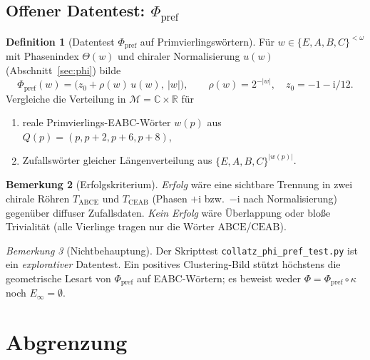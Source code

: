\documentclass[11pt,a4paper]{article}
\theoremstyle{definition}
\newtheorem{definition}{Definition}[section]
\newtheorem{bemerkung}[definition]{Bemerkung}
\theoremstyle{remark}
\newtheorem{remark}[definition]{Bemerkung}
\newcommand{\R}{\mathbb{R}}
\newcommand{\C}{\mathbb{C}}
\newcommand{\Einf}{E_{\infty}}
\newcommand{\SigmaEABC}{\{E,A,B,C\}}
\newcommand{\Phpref}{\Phi_{\mathrm{pref}}}
\begin{document}
\subsection{Offener Datentest: \texorpdfstring{$\Phpref$}{Phi\_pref}}

\begin{definition}[Datentest $\Phpref$ auf Primvierlingswörtern]
Für $w\in\SigmaEABC^{<\omega}$ mit Phasenindex $\Theta(w)$ und
chiraler Normalisierung $u(w)$ (Abschnitt~\ref{sec:phi}) bilde
\[
\Phpref(w)=\bigl(z_0+\rho(w)\,u(w),\ |w|\bigr),
\qquad
\rho(w)=2^{-|w|},\quad z_0=-1-\mathrm{i}/12.
\]
Vergleiche die Verteilung in $\mathcal{M}=\C\times\R$ für
\begin{enumerate}[nosep]
  \item reale Primvierlings-EABC-Wörter $w(p)$ aus $Q(p)=(p,p+2,p+6,p+8)$,
  \item Zufallswörter gleicher Längenverteilung aus $\SigmaEABC^{|w(p)|}$.
\end{enumerate}
\end{definition}

\begin{bemerkung}[Erfolgskriterium]
\emph{Erfolg} wäre eine sichtbare Trennung in zwei chirale Röhren
$T_{\mathrm{ABCE}}$ und $T_{\mathrm{CEAB}}$ (Phasen $+\mathrm{i}$ bzw.\
$-\mathrm{i}$ nach Normalisierung) gegenüber diffuser Zufallsdaten.
\emph{Kein Erfolg} wäre Überlappung oder bloße Trivialität
(alle Vierlinge tragen nur die Wörter $\mathrm{ABCE}$/$\mathrm{CEAB}$).
\end{bemerkung}

\begin{remark}[Nichtbehauptung]
Der Skripttest \texttt{collatz\_phi\_pref\_test.py} ist ein
\emph{explorativer} Datentest. Ein positives Clustering-Bild stützt
höchstens die geometrische Lesart von $\Phpref$ auf EABC-Wörtern;
es beweist weder $\Phi=\Phpref\circ\kappa$ noch $\Einf=\emptyset$.
\end{remark}

\section{Abgrenzung}
\end{document}
